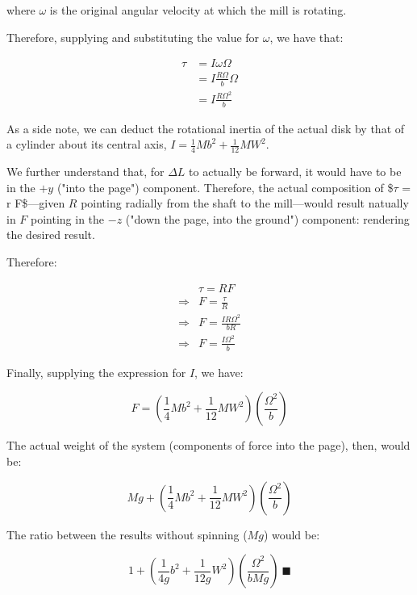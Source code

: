 \documentclass[letterpaper]{article}
\begin{document}
where \(\omega\) is the original angular velocity at which the mill is rotating. 

Therefore, supplying and substituting the value for \(\omega\), we have that:

\begin{align}
   \tau &= I\omega\Omega\\
&= I\frac{R\Omega}{b}\Omega\\
&= I\frac{R{\Omega}^2}{b}
\end{align}

As a side note, we can deduct the rotational inertia of the actual disk by that of a cylinder about its central axis, \(I = \frac{1}{4} Mb^2 + \frac{1}{12}MW^2\).

We further understand that, for \(\Delta L\) to actually be forward, it would have to be in the \(+y\) ("into the page") component. Therefore, the actual composition of \$\(\tau\) = r \texttimes{} F\$---given \(R\) pointing radially from the shaft to the mill---would result natually in \(F\) pointing in the \(-z\) ("down the page, into the ground") component: rendering the desired result.

Therefore:

\begin{align}
   &\tau = RF \\
\Rightarrow &F = \frac{\tau}{R}\\
\Rightarrow &F = \frac{IR{\Omega}^2}{bR}\\
\Rightarrow &F = \frac{I{\Omega}^2}{b}
\end{align}

Finally, supplying the expression for \(I\), we have:

\begin{equation}
    F = \left(\frac{1}{4} Mb^2 + \frac{1}{12}MW^2\right) \left(\frac{{\Omega}^2}{b}\right)
\end{equation}

The actual weight of the system (components of force into the page), then, would be:

\begin{equation}
Mg + \left(\frac{1}{4} Mb^2 + \frac{1}{12}MW^2\right) \left(\frac{{\Omega}^2}{b}\right)
\end{equation}

The ratio between the results without spinning (\(Mg\)) would be:

\begin{equation}
   1 +\left(\frac{1}{4g} b^2 + \frac{1}{12g}W^2\right) \left(\frac{{\Omega}^2}{bMg}\right)\ \blacksquare
\end{equation}
\end{document}
